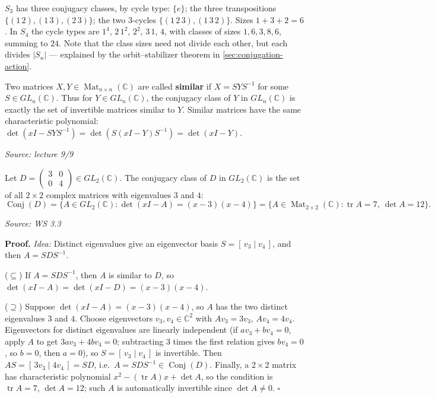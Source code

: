\documentclass[11pt]{report}
\renewenvironment{proof}[1][Proof]{\noindent\textbf{#1.} }{\hfill$\square$\par\vspace{5pt}}
\newcommand{\srcline}[1]{\par\hfill{\footnotesize\textit{Source: #1}}}
\begin{document}
\begin{exbox}\label{ex:conjugacy-classes-s3-s4}
$S_3$ has three conjugacy classes, by cycle type: $\{e\}$; the three transpositions $\{(1\,2), (1\,3), (2\,3)\}$; the two $3$-cycles $\{(1\,2\,3), (1\,3\,2)\}$. Sizes $1 + 3 + 2 = 6$. In $S_4$ the cycle types are $1^4$, $2\,1^2$, $2^2$, $3\,1$, $4$, with classes of sizes $1, 6, 3, 8, 6$, summing to $24$. Note that the class sizes need not divide each other, but each divides $|S_n|$ --- explained by the orbit--stabilizer theorem in \ref{sec:conjugation-action}.
\end{exbox}

\begin{defbox}\label{def:similar-matrices}
Two matrices $X, Y \in \operatorname{Mat}_{n \times n}(\mathbb{C})$ are called \textbf{similar} if $X = SYS^{-1}$ for some $S \in GL_n(\mathbb{C})$. Thus for $Y \in GL_n(\mathbb{C})$, the conjugacy class of $Y$ in $GL_n(\mathbb{C})$ is exactly the set of invertible matrices similar to $Y$. Similar matrices have the same characteristic polynomial: $\det(xI - SYS^{-1}) = \det(S(xI - Y)S^{-1}) = \det(xI - Y)$.
\srcline{lecture 9/9}
\end{defbox}

\begin{propbox}\label{prop:conjugacy-class-diagonal-matrix}
Let $D = \begin{pmatrix} 3 & 0 \\ 0 & 4 \end{pmatrix} \in GL_2(\mathbb{C})$. The conjugacy class of $D$ in $GL_2(\mathbb{C})$ is the set of all $2 \times 2$ complex matrices with eigenvalues $3$ and $4$:
\[ \operatorname{Conj}(D) = \{ A \in GL_2(\mathbb{C}) : \det(xI - A) = (x - 3)(x - 4) \} = \{ A \in \operatorname{Mat}_{2 \times 2}(\mathbb{C}) : \operatorname{tr} A = 7,\ \det A = 12 \}. \]
\srcline{WS 3.3}
\end{propbox}

\begin{proof}
\textit{Idea:} Distinct eigenvalues give an eigenvector basis $S = [\,v_3 \mid v_4\,]$, and then $A = SDS^{-1}$.\par
($\subseteq$) If $A = SDS^{-1}$, then $A$ is similar to $D$, so $\det(xI - A) = \det(xI - D) = (x - 3)(x - 4)$.

($\supseteq$) Suppose $\det(xI - A) = (x - 3)(x - 4)$, so $A$ has the two distinct eigenvalues $3$ and $4$. Choose eigenvectors $v_3, v_4 \in \mathbb{C}^2$ with $Av_3 = 3v_3$, $Av_4 = 4v_4$. Eigenvectors for distinct eigenvalues are linearly independent (if $av_3 + bv_4 = 0$, apply $A$ to get $3av_3 + 4bv_4 = 0$; subtracting $3$ times the first relation gives $bv_4 = 0$, so $b = 0$, then $a = 0$), so $S = [\,v_3 \mid v_4\,]$ is invertible. Then $AS = [\,3v_3 \mid 4v_4\,] = SD$, i.e.\ $A = SDS^{-1} \in \operatorname{Conj}(D)$. Finally, a $2 \times 2$ matrix has characteristic polynomial $x^2 - (\operatorname{tr} A)x + \det A$, so the condition is $\operatorname{tr} A = 7$, $\det A = 12$; such $A$ is automatically invertible since $\det A \neq 0$.
\end{proof}
\end{document}
